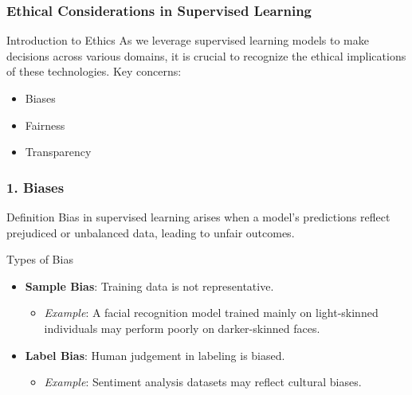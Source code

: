 \documentclass[aspectratio=169]{beamer}
\begin{document}
\begin{frame}[fragile]
    \frametitle{Ethical Considerations in Supervised Learning}
    \begin{block}{Introduction to Ethics}
        As we leverage supervised learning models to make decisions across various domains, it is crucial to recognize the ethical implications of these technologies.
        Key concerns:
        \begin{itemize}
            \item Biases
            \item Fairness
            \item Transparency
        \end{itemize}
    \end{block}
\end{frame}

\begin{frame}[fragile]
    \frametitle{1. Biases}
    \begin{block}{Definition}
        Bias in supervised learning arises when a model's predictions reflect prejudiced or unbalanced data, leading to unfair outcomes.
    \end{block}
    
    \begin{block}{Types of Bias}
        \begin{itemize}
            \item \textbf{Sample Bias}: Training data is not representative.
            \begin{itemize}
                \item \textit{Example}: A facial recognition model trained mainly on light-skinned individuals may perform poorly on darker-skinned faces.
            \end{itemize}
            \item \textbf{Label Bias}: Human judgement in labeling is biased.
            \begin{itemize}
                \item \textit{Example}: Sentiment analysis datasets may reflect cultural biases.
            \end{itemize}
        \end{itemize}
    \end{block}
\end{frame}
\end{document}
